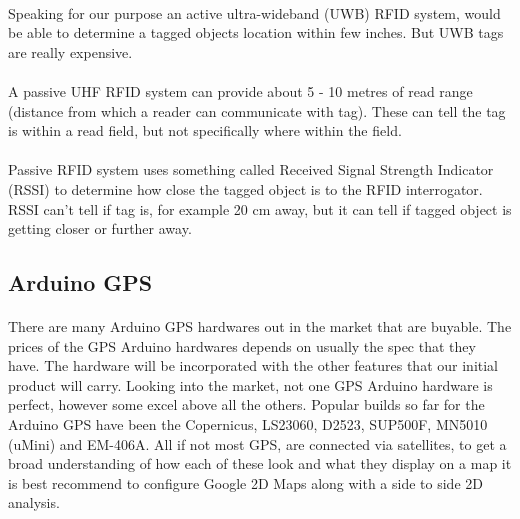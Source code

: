 \documentclass[12pt,a4paper]{article}
\begin{document}
\begin{appendices}
      \paragraph{}
        Speaking for our purpose an active ultra-wideband (UWB) RFID system, would be able to determine a tagged objects location within few inches. But UWB tags are really expensive.
      \paragraph{}
        A passive UHF RFID system can provide about 5 - 10 metres of read range (distance from which a reader can communicate with tag). These can tell the tag is within a read field, but not specifically where within the field.
      \paragraph{}
        Passive RFID system uses something called Received Signal Strength Indicator (RSSI) to determine how close the tagged object is to the RFID interrogator. RSSI can’t tell if tag is, for example 20 cm away, but it can tell if tagged object is getting closer or further away.
    
    \subsection{Arduino GPS}
    \paragraph{}
      There are many Arduino GPS hardwares out in the market that are buyable. The prices of the GPS Arduino hardwares depends on usually the spec that they have. The hardware will be incorporated with the other features that our initial product will carry. Looking into the market, not one GPS Arduino hardware is perfect, however some excel above all the others. Popular builds so far for the Arduino GPS have been the Copernicus, LS23060, D2523, SUP500F, MN5010 (uMini) and EM-406A. All if not most GPS, are connected via satellites, to get a broad understanding of how each of these look and what they display on a map it is best recommend to configure Google 2D Maps along with a side to side 2D analysis.

\end{appendices}
\end{document}
